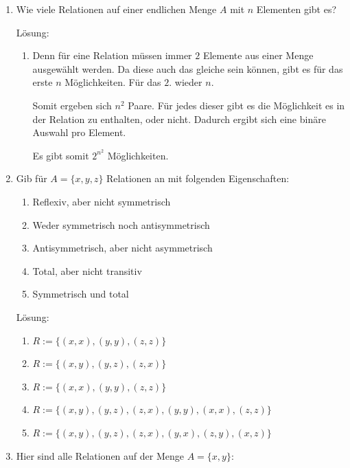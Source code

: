 \documentclass[main.tex]{subfiles}
\begin{document}
\begin{enumerate}
	\item Wie viele Relationen auf einer endlichen Menge \( A \) mit \( n \) Elementen gibt es?

	      Lösung:
	      \begin{enumerate}
		      \item Denn für eine Relation müssen immer \( 2 \) Elemente aus einer Menge ausgewählt werden.
		            Da diese auch das gleiche sein können, gibt es für das erste \( n \) Möglichkeiten. Für das
		            \( 2. \) wieder \( n \).

		            Somit ergeben sich \( n^2 \) Paare. Für jedes dieser gibt es die Möglichkeit es in der
		            Relation zu enthalten, oder nicht. Dadurch ergibt sich eine binäre Auswahl pro Element.

		            Es gibt somit \( 2^{n^2} \) Möglichkeiten.
	      \end{enumerate}
	\item Gib für \( A = \{x, y, z\} \) Relationen an mit folgenden Eigenschaften:
	      \begin{enumerate}
		      \item Reflexiv, aber nicht symmetrisch
		      \item Weder symmetrisch noch antisymmetrisch
		      \item Antisymmetrisch, aber nicht asymmetrisch
		      \item Total, aber nicht transitiv
		      \item Symmetrisch und total
	      \end{enumerate}

	      Lösung:
	      \begin{enumerate}
		      \item \( R := \{ (x,x), (y,y), (z,z) \} \)
		      \item \( R := \{ (x,y), (y,z), (z,x) \} \)
		      \item \( R := \{ (x,x), (y,y), (z,z) \} \)
		      \item \( R := \{ (x,y), (y,z), (z,x), (y,y), (x,x), (z,z) \} \)
		      \item \( R := \{ (x,y), (y,z), (z,x), (y,x), (z,y), (x,z) \} \)
	      \end{enumerate}
	\item Hier sind alle Relationen auf der Menge \( A = \{ x, y \} \):


\end{enumerate}
\end{document}
